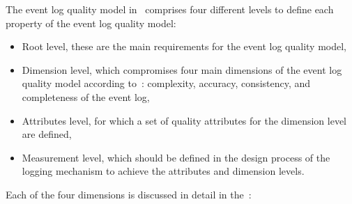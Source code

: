 The event log quality model in~ comprises four different levels to define each property of the event log quality model:

\begin{itemize}
	\item Root level, these are the main requirements for the event log quality model,
	\item Dimension level, which compromises four main dimensions of the event log quality model according to~\cite{Kherbouche2017}: complexity, accuracy, consistency, and completeness of the event log,
	\item Attributes level, for which a set of quality attributes for the dimension level are defined,
	\item Measurement level, which should be defined in the design process of the logging mechanism to achieve the attributes and dimension levels.
\end{itemize}

\clearpage

Each of the four dimensions is discussed in detail in the~:

